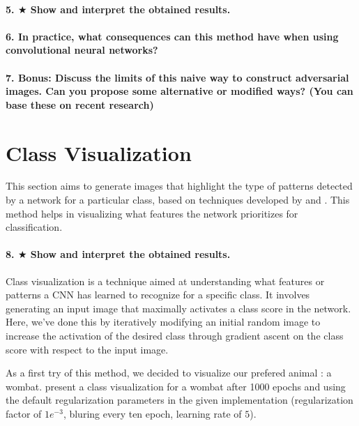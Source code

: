 \paragraph*{5. $ \bigstar $ Show and interpret the obtained results.}

\paragraph*{6. In practice, what consequences can this method have when using convolutional neural networks?}

\paragraph*{7. \textbf{Bonus:} Discuss the limits of this naive way to construct adversarial images. Can you propose some alternative or modiﬁed ways? (You can base these on recent research)}

\section{Class Visualization}

This section aims to generate images that highlight the type of patterns detected by a network for a particular class, based on techniques developed by \cite{simonyan2014deep} and \cite{yosinski2015understanding}. This method helps in visualizing what features the network prioritizes for classification. %

\paragraph*{8. $ \bigstar $ Show and interpret the obtained results.}
Class visualization is a technique aimed at understanding what features or patterns a CNN has learned to recognize for a specific class. It involves generating an input image that maximally activates a class score in the network. Here, we've done this by iteratively modifying an initial random image to increase the activation of the desired class through gradient ascent on the class score with respect to the input image.

As a first try of this method, we decided to visualize our prefered animal : a wombat.  present a class visualization for a wombat after 1000 epochs and using the default regularization parameters in the given implementation (regularization factor of $1e^{-3}$, bluring every ten epoch, learning rate of $5$). 


